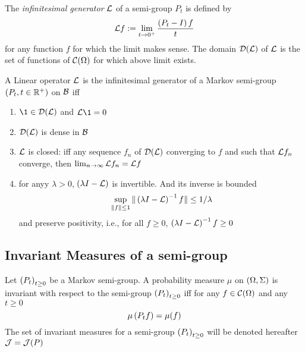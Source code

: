 \documentclass{article}
\begin{document}
\begin{definition}
    The \emph{infinitesimal generator} \(\mathcal{L}\) of a semi-group \(P_t\) is defined by 
    \begin{equation}
        \mathcal{L} f:= \lim_{t\to 0^+} \frac{\left( P_t-I \right)f}{t}
    \end{equation}
    for any function \(f\) for which the limit makes sense. The domain \(\mathcal{D}(\mathcal{L})\) of \(\mathcal{L}\) is the set of functions of \(\mathcal{C}(\Omega)\) for which above limit exists.
\end{definition}

\begin{theorem}
    A Linear operator \(\mathcal{L}\) is the infinitesimal generator of a Markov semi-group \(\left( P_t,t\in\mathbb{R}^+ \right)\) on \(\mathcal{B} \) iff
    \begin{enumerate}
        \item \(\1\in\cD(\cL)\) and \(\cL\1=0\)
        \item \(\mathcal{D}(\mathcal{L})\) is dense in \(\mathcal{B}\)
        \item \(\mathcal{L}\) is closed: iff any sequence \(f_n\) of \(\mathcal{D}(\mathcal{L})\) converging to \(f\) and such that \(\mathcal{L} f_n\) converge, then \(\lim_{n\to\infty} \mathcal{L} f_n=\mathcal{L} f\)
        \item for anyy \(\lambda >0\), \(\left( \lambda I-\mathcal{L} \right)\) is invertible. And its inverse is bounded \[\sup_{\| f \|\leq 1} \| \left( \lambda I-\mathcal{L} \right)^{-1}f \|\leq 1/\lambda\]
        and preserve positivity, i.e., for all \(f\geq 0\), \(\left( \lambda I-\mathcal{L} \right)^{-1}f\geq 0\)
    \end{enumerate}
\end{theorem}

\subsection{Invariant Measures of a semi-group}

\begin{definition}
    Let \(\left( P_t \right)_{t\geq 0}\) be a Markov semi-group. A probability measure \(\mu\) on \(\left( \Omega,\Sigma \right)\) is invariant with respect to the semi-group \(\left( P_t \right)_{t\geq 0}\) iff for any \(f\in \mathcal{C}(\Omega)\) and any \(t\geq 0\)
    \begin{equation}
        \mu\left( P_t f \right) = \mu(f)
    \end{equation}
    The set of invariant measures for a semi-group \(\left( P_t \right)_{t\geq 0}\) will be denoted hereafter \(\mathcal{J}=\mathcal{J}(P)\)
\end{definition}
\end{document}
